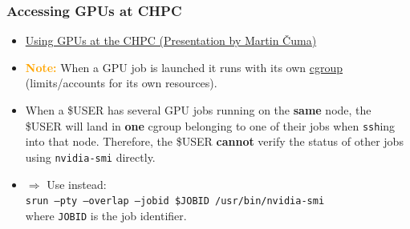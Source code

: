 \begin{frame}
  \frametitle{Accessing GPUs at CHPC}
  \begin{itemize}
    \item \href{https://www.chpc.utah.edu/presentations/images-and-pdfs/usinggpuss24f.pdf}{Using GPUs at the CHPC (Presentation by Martin \v{C}uma)}
    \item \textbf{\textcolor{orange}{Note:}}
          When a GPU job is launched it runs with its own
          \href{https://en.wikipedia.org/wiki/Cgroups}{cgroup}
          (limits/accounts for its own resources).
    \item When a \$USER has several GPU jobs running on the \textbf{same} node,
          the \$USER will land in \textbf{one} cgroup belonging to one of their jobs
          when \texttt{ssh}ing into that node.
          Therefore, the \$USER \textbf{cannot} verify the status of other jobs
          using \texttt{nvidia-smi} directly.
    \item $\Rightarrow$ Use instead:\\
          \texttt{srun --pty --overlap --jobid \$JOBID /usr/bin/nvidia-smi}\\
          where \texttt{JOBID} is the job identifier.
  \end{itemize}
\end{frame}
